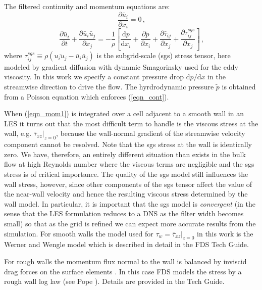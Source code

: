 \documentclass[11pt]{book}
\begin{document}
The filtered continuity and momentum equations are:
\begin{equation}
\label{eqn_cont}
\frac{\partial \bar{u}_i}{\partial x_i} = 0 \,\mbox{,}
\end{equation}
\begin{equation}
\label{eqn_mom1}
\frac{\partial \bar{u}_i}{\partial t} + \frac{\partial \bar{u}_i \bar{u}_j}{\partial x_j} = -\frac{1}{\rho} \left[ \frac{\mbox{d}p}{\mbox{d}x_i} + \frac{\partial \tilde{p}}{\partial x_i} + \frac{\partial \bar{\tau}_{ij}}{\partial x_j} + \frac{\partial \tau_{ij}^{sgs}}{\partial x_j} \right]\,\mbox{,}
\end{equation}
where $\tau_{ij}^{sgs} \equiv \rho(\overline{u_i u_j} - \bar{u}_i \bar{u}_j)$ is the subgrid-scale (sgs) stress tensor, here modeled by gradient diffusion with dynamic Smagorinsky \cite{Germano:1991} used for the eddy viscosity.  In this work we specify a constant pressure drop $\mbox{d}p/\mbox{d}x$ in the streamwise direction to drive the flow.  The hyrdrodynamic pressure $\tilde{p}$ is obtained from a Poisson equation which enforces (\ref{eqn_cont}).

When (\ref{eqn_mom1}) is integrated over a cell adjacent to a smooth wall in an LES it turns out that the most difficult term to handle is the viscous stress at the wall, e.g. $\bar{\tau}_{xz}|_{z=0}$, because the wall-normal gradient of the streamwise velocity component cannot be resolved.  Note that the sgs stress at the wall is identically zero.  We have, therefore, an entirely different situation than exists in the bulk flow at high Reynolds number where the viscous terms are negligible and the sgs stress is of critical importance.  The quality of the sgs model still influences the wall stress, however, since other components of the sgs tensor affect the value of the near-wall velocity and hence the resulting viscous stress determined by the wall model.  In particular, it is important that the sgs model is \emph{convergent} (in the sense that the LES formulation reduces to a DNS as the filter width becomes small) so that as the grid is refined we can expect more accurate results from the simulation.  For smooth walls the model used for $\tau_w = \bar{\tau}_{xz}|_{z=0}$ in this work is the Werner and Wengle model \cite{Werner:1991} which is described in detail in the FDS Tech Guide.

For rough walls the momentum flux normal to the wall is balanced by inviscid drag forces on the surface elements \cite{TennekesLumley}.  In this case FDS models the stress by a rough wall log law (see Pope \cite{Pope:2000}).  Details are provided in the Tech Guide.
\end{document}
